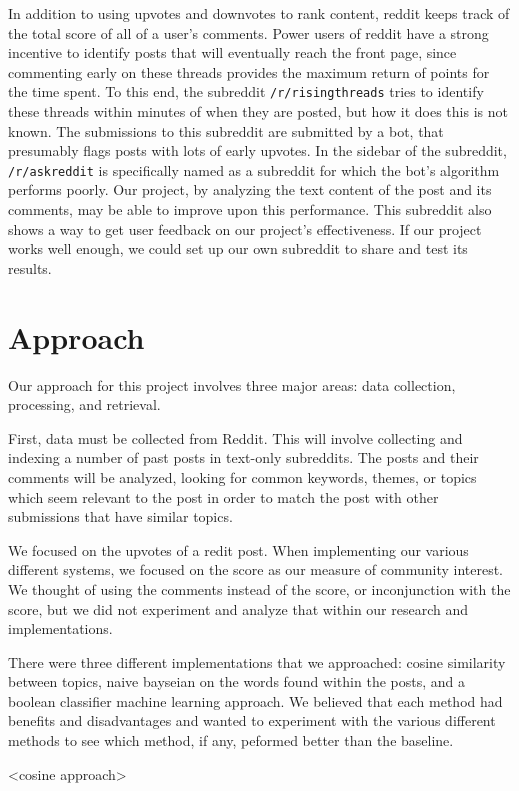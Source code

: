 \documentclass{acm_proc_article-sp}
\begin{document}
In addition to using upvotes and downvotes to rank content, reddit keeps track
of the total score of all of a user's comments. Power users of reddit have a
strong incentive to identify posts that will eventually reach the front page,
since commenting early on these threads provides the maximum return of points
for the time spent. To this end, the subreddit \texttt{/r/risingthreads} tries
to identify these threads within minutes of when they are posted, but how it
does this is not known. The submissions to this subreddit are submitted by a
bot, that presumably flags posts with lots of early upvotes. In the sidebar of
the subreddit, \texttt{/r/askreddit} is specifically named as a subreddit for
which the bot's algorithm performs poorly. Our project, by analyzing the text
content of the post and its comments, may be able to improve upon this
performance. This subreddit also shows a way to get user feedback on our
project's effectiveness. If our project works well enough, we could set up our
own subreddit to share and test its results.

\section{Approach}
Our approach for this project involves three major areas: data collection, processing, and retrieval.

First, data must be collected from Reddit.  This will involve collecting and indexing a number of past posts
in text-only subreddits.  The posts and their comments will be analyzed, looking for common keywords,
themes, or topics which seem relevant to the post in order to match the post with other submissions
that have similar topics.

We focused on the upvotes of a redit post. When implementing our various different systems, we focused on the score as our measure of community interest. We thought of using the comments instead of the score, or inconjunction with the score, but we did not experiment and analyze that within our research and implementations.

There were three different implementations that we approached: cosine similarity between topics, naive bayseian on the words found within the posts, and a boolean classifier machine learning approach. We believed that each method had benefits and disadvantages and wanted to experiment with the various different methods to see which method, if any, peformed better than the baseline.

<cosine approach>
\end{document}
